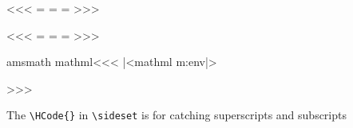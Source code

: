 {{{{{{\<\><<<
\def\underarrow:#1#2#3{|<under arrow|>}
\def\overarrow:#1#2#3{|<over arrow|>}
\def\:tempc{\mathpalette{\overarrow:\rightarrow}}
\HLet\overrightarrow=\:tempc
\def\:tempc{\mathpalette{\overarrow:\leftarrow}}
\HLet\overleftarrow=\:tempc
\def\:tempc{\mathpalette{\overarrow:\leftrightarrow}}
\HLet\overleftrightarrow=\:tempc
>>>

\<\><<<
\def\:tempc{\mathpalette{\underarrow:\rightarrow}}
\HLet\underrightarrow=\:tempc
\def\:tempc{\mathpalette{\underarrow:\leftarrow}}
\HLet\underleftarrow=\:tempc
\def\:tempc{\mathpalette{\underarrow:\leftrightarrow}}
\HLet\underleftrightarrow=\:tempc
>>>



\<amsmath mathml\><<<
|<mathml m:env|>
\renewcommand{\xrightarrow}[2][]{%
   \Tg<\a:mathml munderover>%
     \rightarrow
     \Tg<\a:mathml mrow\Hnewline>#1\Tg</\a:mathml mrow>%
     \Tg<\a:mathml mrow\Hnewline>#2\Tg</\a:mathml mrow>%
   \Tg</\a:mathml munderover>}%
\renewcommand{\xleftarrow}[2][]{%
   \Tg<\a:mathml munderover>%
      \leftarrow
      \Tg<\a:mathml mrow\Hnewline>#1\Tg</\a:mathml mrow>%
      \Tg<\a:mathml mrow\Hnewline>#2\Tg</\a:mathml mrow>%
   \Tg</\a:mathml munderover>}%

\def\overset#1#2{{%
      \Tg<\a:mathml mover class="overset">\Tg<\a:mathml
                              mrow\Hnewline>#2\Tg</\a:mathml mrow>%
                \Tg<\a:mathml mrow\Hnewline>#1\Tg</\a:mathml mrow>%
      \Tg</\a:mathml mover>}}%
\def\underset#1#2{{%
      \Tg<\a:mathml munder>\Tg<\a:mathml mrow\Hnewline>#2\Tg</\a:mathml mrow>%
                 \Tg<\a:mathml mrow\Hnewline>#1\Tg</\a:mathml mrow>%
      \Tg</\a:mathml munder>}}%

\def\sideset#1#2#3{{\Tg<\a:mathml mrow \mml:class="sideset"\Hnewline
        >{\HCode{}}#1{\HCode{}#3}#2\Tg</\a:mathml mrow>}}
>>>

 The \verb'\HCode{}' in \verb'\sideset' is for catching superscripts and subscripts






}}}}}}
